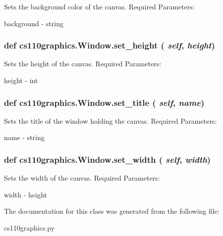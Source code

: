 Sets the background color of the canvas. Required Parameters:
\begin{DoxyItemize}
\item background -\/ string 
\end{DoxyItemize}\hypertarget{classcs110graphics_1_1Window_a9b548549f8f09ca3f29e6e80483e21d2}{
\subsubsection[{set\_\-height}]{\setlength{\rightskip}{0pt plus 5cm}def cs110graphics.Window.set\_\-height ( {\em self}, \/   {\em height})}}
\label{classcs110graphics_1_1Window_a9b548549f8f09ca3f29e6e80483e21d2}


Sets the height of the canvas. Required Parameters:
\begin{DoxyItemize}
\item height -\/ int 
\end{DoxyItemize}\hypertarget{classcs110graphics_1_1Window_a227c806c2acbcaca9958ba3b610a85f6}{
\subsubsection[{set\_\-title}]{\setlength{\rightskip}{0pt plus 5cm}def cs110graphics.Window.set\_\-title ( {\em self}, \/   {\em name})}}
\label{classcs110graphics_1_1Window_a227c806c2acbcaca9958ba3b610a85f6}


Sets the title of the window holding the canvas. Required Parameters:
\begin{DoxyItemize}
\item name -\/ string 
\end{DoxyItemize}\hypertarget{classcs110graphics_1_1Window_a55036373bfb4437eb4368a39fedb8722}{
\subsubsection[{set\_\-width}]{\setlength{\rightskip}{0pt plus 5cm}def cs110graphics.Window.set\_\-width ( {\em self}, \/   {\em width})}}
\label{classcs110graphics_1_1Window_a55036373bfb4437eb4368a39fedb8722}


Sets the width of the canvas. Required Parameters:
\begin{DoxyItemize}
\item width -\/ height 
\end{DoxyItemize}

The documentation for this class was generated from the following file:\begin{DoxyCompactItemize}
\item 
cs110graphics.py\end{DoxyCompactItemize}
